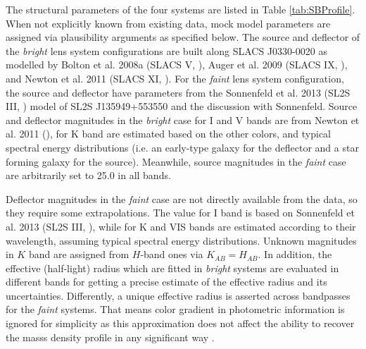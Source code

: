 \documentclass[a4paper,11pt]{article}
\begin{document}
The structural parameters of the four systems are listed in Table
\ref{tab:SBProfile}. When not explicitly known from existing data,
mock model parameters are assigned via plausibility arguments as
specified below. The source and deflector of the \textit{bright} lens
system configurations are built along SLACS J0330-0020 as modelled by
Bolton et al. 2008a (SLACS V, \cite{2008ApJ...682..964B}), Auger et
al. 2009 (SLACS IX, \cite{2009ApJ...705.1099A}), and Newton et
al. 2011 (SLACS XI, \cite{2011ApJ...734..104N}). For the
\textit{faint} lens system configuration, the source and deflector
have parameters from the Sonnenfeld et al. 2013 (SL2S III,
\cite{2013ApJ...777...97S}) model of SL2S J135949+553550 and the
discussion with Sonnenfeld. Source and deflector magnitudes in the
\textit{bright} case for I and V bands are from Newton et al. 2011
(\cite{2011ApJ...734..104N}), for K band are estimated based on the
other colors, and typical spectral energy distributions (i.e. an
early-type galaxy for the deflector and a star forming galaxy for the
source). Meanwhile, source magnitudes in the \textit{faint} case are
arbitrarily set to 25.0 in all bands.

Deflector magnitudes in the \textit{faint} case are not directly
available from the data, so they require some extrapolations. The
value for I band is based on Sonnenfeld et al. 2013 (SL2S III,
\cite{2013ApJ...777...97S}), while for K and VIS bands are estimated
according to their wavelength, assuming typical spectral energy
distributions. Unknown magnitudes in $K$ band are assigned from
$H$-band ones via $K_{AB}=H_{AB}.$ In addition, the effective
(half-light) radius which are fitted in \textit{bright} systems are
evaluated in different bands for getting a precise estimate of the
effective radius and its uncertainties. Differently, a unique
effective radius is asserted across bandpasses for the \textit{faint}
systems. That means color gradient in photometric information is
ignored for simplicity as this approximation does not affect the
ability to recover the masss density profile in any significant way
\cite{2013ApJ...777...97S}.

\end{document}

